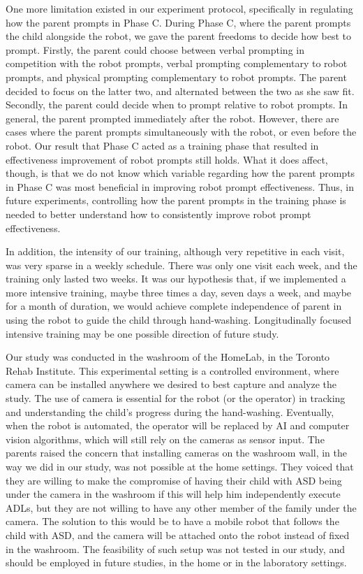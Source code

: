 One more limitation existed in our experiment protocol, specifically in regulating how the parent prompts in Phase C.  During Phase C, where the parent prompts the child alongside the robot, we gave the parent freedoms to decide how best to prompt.  Firstly, the parent could choose between verbal prompting in competition with the robot prompts, verbal prompting complementary to robot prompts, and physical prompting complementary to robot prompts.  The parent decided to focus on the latter two, and alternated between the two as she saw fit.  Secondly, the parent could decide when to prompt relative to robot prompts.  In general, the parent prompted immediately after the robot.  However, there are cases where the parent prompts simultaneously with the robot, or even before the robot.  Our result that Phase C acted as a training phase that resulted in effectiveness improvement of robot prompts still holds.  What it does affect, though, is that we do not know which variable regarding how the parent prompts in Phase C was most beneficial in improving robot prompt effectiveness.  Thus, in future experiments, controlling how the parent prompts in the training phase is needed to better understand how to consistently improve robot prompt effectiveness.

In addition, the intensity of our training, although very repetitive in each visit, was very sparse in a weekly schedule.  There was only one visit each week, and the training only lasted two weeks.  It was our hypothesis that, if we implemented a more intensive training, maybe three times a day, seven days a week, and maybe for a month of duration, we would achieve complete independence of parent in using the robot to guide the child through hand-washing.  Longitudinally focused intensive training may be one possible direction of future study.

Our study was conducted in the washroom of the HomeLab, in the Toronto Rehab Institute.  This experimental setting is a controlled environment, where camera can be installed anywhere we desired to best capture and analyze the study.  The use of camera is essential for the robot (or the operator) in tracking and understanding the child's progress during the hand-washing.  Eventually, when the robot is automated, the operator will be replaced by AI and computer vision algorithms, which will still rely on the cameras as sensor input.  The parents raised the concern that installing cameras on the washroom wall, in the way we did in our study, was not possible at the home settings.  They voiced that they are willing to make the compromise of having their child with ASD being under the camera in the washroom if this will help him independently execute ADLs, but they are not willing to have any other member of the family under the camera.  The solution to this would be to have a mobile robot that follows the child with ASD, and the camera will be attached onto the robot instead of fixed in the washroom.  The feasibility of such setup was not tested in our study, and should be employed in future studies, in the home or in the laboratory settings.

